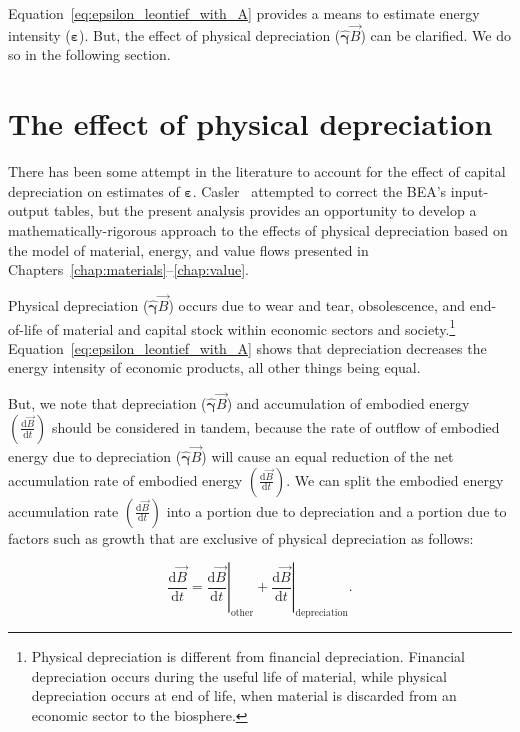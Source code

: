Equation~\ref{eq:epsilon_leontief_with_A} provides a means 
to estimate energy intensity ($\bm{\varepsilon}$). 
But, the effect of physical depreciation ($\hat{\bm{\gamma}}\vec{B}$) 
can be clarified.
We do so in the following section.

\section{The effect of physical depreciation}

There has been some attempt in the literature to 
account for the effect
of capital depreciation on estimates 
of $\bm{\varepsilon}$. 
Casler~\cite{Casler:1983uy} attempted to correct the BEA's
input-output tables,
but the present analysis provides an opportunity
to develop a mathematically-rigorous approach to the 
effects of physical depreciation based on 
the model of material, energy, and value flows presented 
in Chapters~\ref{chap:materials}--\ref{chap:value}.

Physical depreciation ($\hat{\bm{\gamma}}\vec{B}$)
occurs due to wear and tear, obsolescence, and end-of-life
of material and capital stock 
within economic sectors and society.\footnote{Physical depreciation
is different from financial depreciation. 
Financial depreciation occurs during the useful life of material, 
while physical depreciation occurs at end of life, 
when material is discarded from an economic sector to the biosphere.}
Equation~\ref{eq:epsilon_leontief_with_A} shows that 
depreciation decreases the energy intensity of economic products,
all other things being equal.

But, we note that depreciation ($\hat{\bm{\gamma}}\vec{B}$) 
and accumulation of embodied energy 
$\left( \frac{\mathrm{d}\vec{B}}{\mathrm{d}t} \right)$
should be considered in tandem,
because the rate of outflow of embodied energy due to depreciation
($\hat{\bm{\gamma}}\vec{B}$)
will cause an equal reduction of the net accumulation rate of embodied energy
$\left( \frac{\mathrm{d}\vec{B}}{\mathrm{d}t} \right)$.
We can split the embodied energy accumulation rate 
$\left( \frac{\mathrm{d}\vec{B}}{\mathrm{d}t} \right)$
into a portion due to depreciation and a portion due to 
factors such as growth that are exclusive of physical depreciation as follows:

\begin{equation} \label{eq:dB_dt_split}
	\frac{\mathrm{d}\vec{B}}{\mathrm{d}t} 
	= \left. \frac{\mathrm{d}\vec{B}}{\mathrm{d}t} \right|_{\mathrm{other}} 
	+ \left. \frac{\mathrm{d}\vec{B}}{\mathrm{d}t} \right|_{\mathrm{depreciation}}.
\end{equation}

